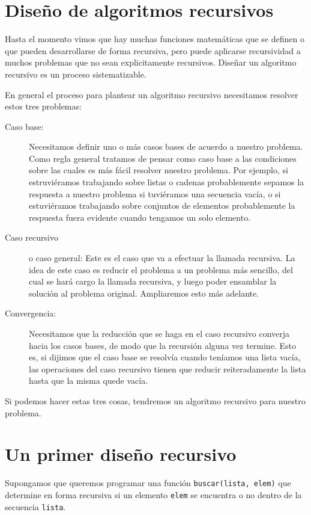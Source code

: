 \section{Diseño de algoritmos recursivos}

Hasta el momento vimos que hay muchas funciones matemáticas que se definen
o que pueden desarrollarse de forma recursiva, pero puede aplicarse recursividad
a muchos problemas que no sean explicitamente recursivos. Diseñar un
algoritmo recursivo es un proceso sistematizable.

En general el proceso para plantear un algoritmo recursivo necesitamos
resolver estos tres problemas:
\begin{description}
\item[Caso base:] Necesitamos definir uno o más casos bases de acuerdo a
nuestro problema. Como regla general tratamos de pensar como caso base a
las condiciones sobre las cuales es más fácil resolver nuestro problema.
Por ejemplo, si estruviéramos trabajando sobre listas o cadenas probablemente
sepamos la respuesta a nuestro problema si tuviéramos una secuencia vacía,
o si estuviéramos trabajando sobre conjuntos de elementos probablemente la
respuesta fuera evidente cuando tengamos un solo elemento.
\item[Caso recursivo] o caso general: Este es el caso que va a efectuar
la llamada recursiva. La idea de este caso es reducir el problema a un
problema más sencillo, del cual se hará cargo la llamada recursiva, y luego
poder ensamblar la solución al problema original. Ampliaremos esto más adelante.
\item[Convergencia:] Necesitamos que la reducción que se haga en el caso
recursivo converja hacia los casos bases, de modo que la recursión alguna
vez termine. Esto es, si dijimos que el caso base se resolvía cuando teníamos
una lista vacía, las operaciones del caso recursivo tienen que reducir
reiteradamente la lista hasta que la misma quede vacía.
\end{description}
Si podemos hacer estas tres cosas, tendremos un algoritmo recursivo para
nuestro problema.

\section{Un primer diseño recursivo}

Supongamos que queremos programar una función \lstinline!buscar(lista, elem)! que
determine en forma recursiva si un elemento \lstinline!elem! se encuentra o no
dentro de la secuencia \lstinline!lista!.

